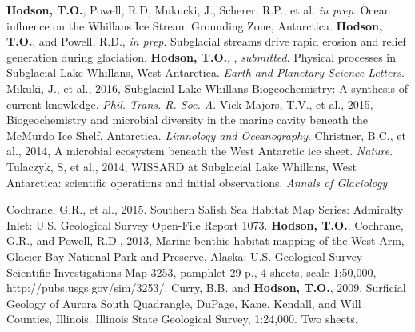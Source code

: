 \renewcommand{\refname}{Publications}
\begin{thebibliography}{1}
\bibitem{}\textbf{Hodson, T.O.}, Powell, R.D, Mukucki, J., Scherer, R.P., et al. 
\textsl{in prep}. Ocean influence on the Whillans Ice Stream Grounding Zone, Antarctica. 
\bibitem{}\textbf{Hodson, T.O.}, and Powell, R.D., \textsl{in prep}. Subglacial streams drive rapid erosion and relief generation during glaciation.
\bibitem{}\textbf{Hodson, T.O.}, , \textsl{submitted}. Physical processes in Subglacial Lake Whillans, West Antarctica.
\textsl{Earth and Planetary Science Letters}.
\bibitem{}Mikuki, J., et al., 2016, Subglacial Lake Whillans Biogeochemistry: A synthesis of current knowledge. \textsl{Phil. Trans. R. Soc. A}.
\bibitem{}Vick-Majors, T.V., et al., 2015, Biogeochemistry and microbial diversity in the marine cavity beneath the McMurdo Ice Shelf, Antarctica.
\textsl{Limnology and Oceanography}.
\bibitem{}Christner, B.C., et al., 2014, A microbial ecosystem beneath the West Antarctic ice sheet. \textsl{Nature}.
\bibitem{}Tulaczyk, S, et al., 2014, WISSARD at Subglacial Lake Whillans, West Antarctica: scientific operations and initial observations. \textsl{Annals of Glaciology}
\end{thebibliography}
\renewcommand{\refname}{Other Publications}
\begin{thebibliography}{1}
\bibitem{}Cochrane, G.R., et al., 2015. Southern Salish Sea Habitat Map Series: Admiralty Inlet: U.S. Geological Survey Open-File Report 1073.
\bibitem{}\textbf{Hodson, T.O.}, Cochrane, G.R., and Powell, R.D., 2013, Marine benthic habitat mapping of the West Arm, Glacier Bay National Park and Preserve, Alaska: U.S. Geological Survey Scientific Investigations Map 3253, pamphlet 29 p., 4 sheets, scale 1:50,000, http://pubs.usgs.gov/sim/3253/.
\bibitem{}Curry, B.B. and \textbf{Hodson, T.O.}, 2009, Surficial Geology of Aurora South Quadrangle, DuPage, Kane, Kendall, and Will Counties, Illinois. Illinois State Geological Survey, 1:24,000. Two sheets.
\end{thebibliography}

